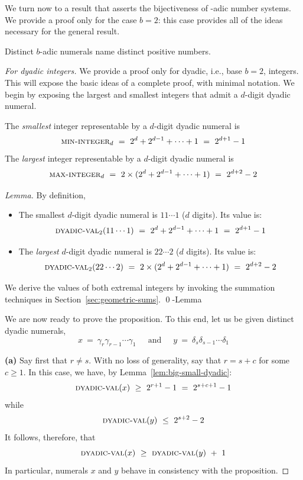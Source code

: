 We turn now to a result that asserts the bijectiveness of -adic number
systems.  We provide a proof only for the case $b = 2$: this case
provides all of the ideas necessary for the general result.

\begin{prop}
\label{thm:adic-bijective}
Distinct $b$-adic numerals name distinct positive numbers.
\end{prop}

\begin{proof}[For dyadic integers]
We provide a proof only for dyadic, i.e., base $b=2$, integers.  This
will expose the basic ideas of a complete proof, with minimal
notation.  We begin by exposing the largest and smallest integers that
admit a $d$-digit dyadic numeral.

\begin{lemma}
\label{lem:big-small-dyadic}
The {\em smallest} integer representable by a $d$-digit dyadic
numeral is 
\[ \mbox{\sc min-integer}_d \ = \ 2^d + 2^{d-1} + \cdots + 1 \ = \ 2^{d+1} - 1
\]
The {\em largest} integer representable by a $d$-digit dyadic
numeral is
\[ \mbox{\sc max-integer}_d \ = \
2 \times (2^d + 2^{d-1} + \cdots + 1) \ = \ 2^{d+2} - 2
\]
\end{lemma}

\begin{proof}[Lemma]
By definition,
\begin{itemize}
\item
The smallest $d$-digit dyadic numeral is $11 \cdots 1$ ($d$ digits).
Its value is:
\[ \mbox{\sc dyadic-val}_2(11 \cdots 1)
 \ = \ 2^d + 2^{d-1} + \cdots + 1 \ = \ 2^{d+1} - 1 \]
\item
The {\em largest} $d$-digit dyadic numeral is 
$22 \cdots 2$ ($d$ digits).  Its value is:
\[ \mbox{\sc dyadic-val}_2(22 \cdots 2)
\ = \ 2 \times (2^d + 2^{d-1} + \cdots + 1) \ = \ 2^{d+2} - 2 \]
\end{itemize}
We derive the values of both extremal integers by invoking the
summation techniques in Section~\ref{sec:geometric-sums}.
\qed-Lemma
\end{proof}

\bigskip

We are now ready to prove the proposition.  To this end, let us be
given distinct dyadic numerals,
\[
x \ = \ \gamma_r \gamma_{r-1} \cdots \gamma_1
 \ \ \ \ \ \mbox{ and } \ \ \ \ \
y \ = \ \delta_s \delta_{s-1} \cdots \delta_1
\]

{\bf (a)} Say first that $r \neq s$.  With no loss of generality, say
that $r = s +c$ for some $c \geq 1$.  In this case, we have, by
Lemma~\ref{lem:big-small-dyadic}:
\[ \mbox{\sc dyadic-val}(x) \ \geq \ 2^{r+1} - 1 \ = \ 2^{s+c+1} -1 \]
while
\[ \mbox{\sc dyadic-val}(y) \ \leq \ 2^{s+2} - 2 \]
It follows, therefore, that
\[ \mbox{\sc dyadic-val}(x) \ \geq \ \mbox{\sc dyadic-val}(y) \ + \ 1 \]
In particular, numerals $x$ and $y$ behave in consistency with the
proposition.


\end{proof}
